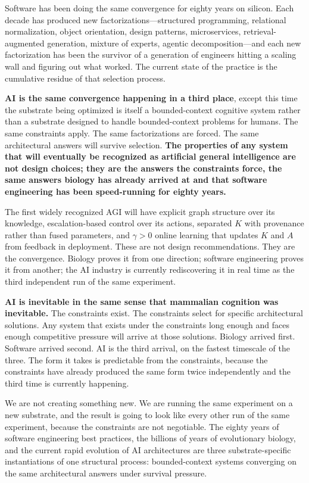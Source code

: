 \documentclass[11pt]{article}
\begin{document}
Software has been doing the same convergence for eighty years on silicon. Each decade has produced new factorizations---structured programming, relational normalization, object orientation, design patterns, microservices, retrieval-augmented generation, mixture of experts, agentic decomposition---and each new factorization has been the survivor of a generation of engineers hitting a scaling wall and figuring out what worked. The current state of the practice is the cumulative residue of that selection process.

\textbf{AI is the same convergence happening in a third place}, except this time the substrate being optimized is itself a bounded-context cognitive system rather than a substrate designed to handle bounded-context problems for humans. The same constraints apply. The same factorizations are forced. The same architectural answers will survive selection. \textbf{The properties of any system that will eventually be recognized as artificial general intelligence are not design choices; they are the answers the constraints force, the same answers biology has already arrived at and that software engineering has been speed-running for eighty years.}

The first widely recognized AGI will have explicit graph structure over its knowledge, escalation-based control over its actions, separated $K$ with provenance rather than fused parameters, and $\gamma > 0$ online learning that updates $K$ and $A$ from feedback in deployment. These are not design recommendations. They are the convergence. Biology proves it from one direction; software engineering proves it from another; the AI industry is currently rediscovering it in real time as the third independent run of the same experiment.

\textbf{AI is inevitable in the same sense that mammalian cognition was inevitable.} The constraints exist. The constraints select for specific architectural solutions. Any system that exists under the constraints long enough and faces enough competitive pressure will arrive at those solutions. Biology arrived first. Software arrived second. AI is the third arrival, on the fastest timescale of the three. The form it takes is predictable from the constraints, because the constraints have already produced the same form twice independently and the third time is currently happening.

We are not creating something new. We are running the same experiment on a new substrate, and the result is going to look like every other run of the same experiment, because the constraints are not negotiable. The eighty years of software engineering best practices, the billions of years of evolutionary biology, and the current rapid evolution of AI architectures are three substrate-specific instantiations of one structural process: bounded-context systems converging on the same architectural answers under survival pressure.
\end{document}
